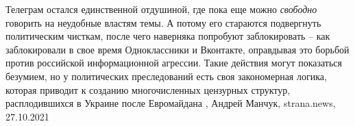 Телеграм остался единственной отдушиной, где пока еще можно \emph{свободно}
говорить на неудобные властям темы. А потому его стараются подвергнуть
политическим чисткам, после чего наверняка попробуют заблокировать – как
заблокировали в свое время Одноклассники и Вконтакте, оправдывая это борьбой
против российской информационной агрессии.  Такие действия могут показаться
безумием, но у политических преследований есть своя закономерная логика,
которая приводит к созданию многочисленных цензурных структур, расплодившихся в
Украине после Евромайдана
, 
Андрей Манчук, strana.news, 27.10.2021
